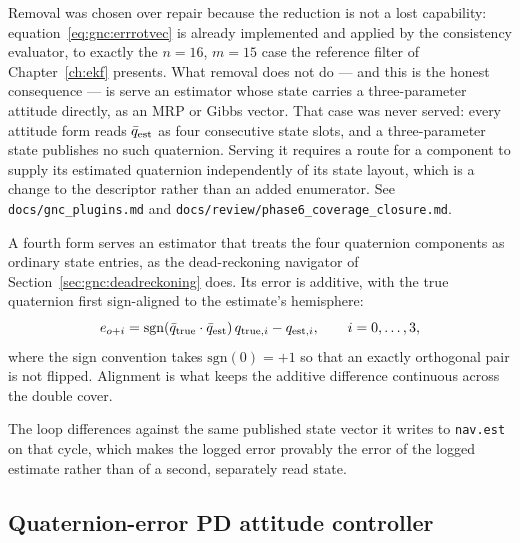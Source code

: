 Removal was chosen over repair because the reduction is not a lost
capability: equation~\eqref{eq:gnc:errrotvec} is already implemented and
applied by the consistency evaluator, to exactly the $n = 16$, $m = 15$ case
the reference filter of Chapter~\ref{ch:ekf} presents. What removal does not
do --- and this is the honest consequence --- is serve an estimator whose
state carries a three-parameter attitude directly, as an MRP or Gibbs
vector. That case was never served: every attitude form reads
$\bar{q}_{\mathrm{est}}$ as four consecutive state slots, and a
three-parameter state publishes no such quaternion. Serving it requires a
route for a component to supply its estimated quaternion independently of
its state layout, which is a change to the descriptor rather than an added
enumerator. See \texttt{docs/gnc\_plugins.md} and
\texttt{docs/review/phase6\_coverage\_closure.md}.

A fourth form serves an estimator that treats the four quaternion
components as ordinary state entries, as the dead-reckoning navigator of
Section~\ref{sec:gnc:deadreckoning} does. Its error is additive, with the
true quaternion first sign-aligned to the estimate's hemisphere:
\begin{equation}
  e_{o+i} =
  \mathrm{sgn}\!\left(\bar{q}_{\mathrm{true}} \cdot
    \bar{q}_{\mathrm{est}}\right) q_{\mathrm{true},i}
  - q_{\mathrm{est},i},
  \qquad i = 0,\ldots,3,
  \label{eq:gnc:erradd}
\end{equation}
where the sign convention takes $\mathrm{sgn}(0) = +1$ so that an exactly
orthogonal pair is not flipped. Alignment is what keeps the additive
difference continuous across the double cover.

The loop differences against the same published state vector it writes to
\texttt{nav.est} on that cycle, which makes the logged error provably the
error of the logged estimate rather than of a second, separately read
state.

\subsection{Quaternion-error PD attitude controller}
\label{sec:gnc:pd}

